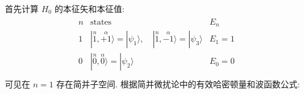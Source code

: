 \documentclass[../../main.tex]{subfiles}
\begin{document}
\begin{enumerate}
\begin{enumerate}
{{%
    
    首先计算 $H_{0}$ 的本征矢和本征值:
    \begin{align*}
        \begin{matrix}
            n & \text{states} & E_{n}\\
            1 & |\stackrel{n}{1}, \stackrel{\alpha}{+1}\rangle = |\psi_{1}\rangle,\quad |\stackrel{n}{1},\stackrel{\alpha}{-1}\rangle = |\psi_{3}\rangle & E_{1} = 1\\
            0 & |\stackrel{n}{0},\stackrel{\alpha}{0}\rangle = |\psi_{2}\rangle & E_{0} = 0\\
        \end{matrix}
    \end{align*}
    可见在 $n=1$ 存在简并子空间. 根据简并微扰论中的有效哈密顿量和波函数公式:
    
}}
\end{enumerate}
\end{enumerate}
\end{document}
